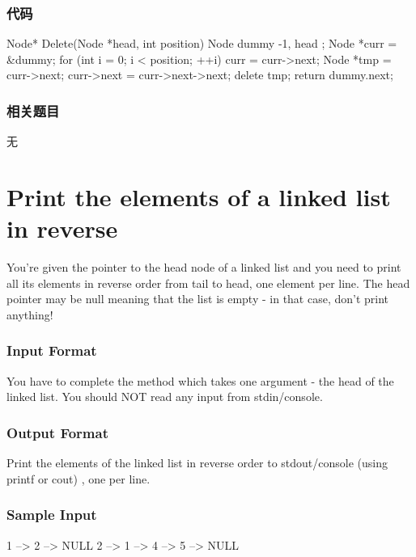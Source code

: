 \subsubsection{代码}
\begin{Code}
Node* Delete(Node *head, int position) {
    Node dummy{ -1, head };
    Node *curr = &dummy;
    for (int i = 0; i < position; ++i)
        curr = curr->next;
    Node *tmp = curr->next;
    curr->next = curr->next->next;
    delete tmp;
    return dummy.next;
}
\end{Code}


\subsubsection{相关题目}
\begindot
\item 无
\myenddot


\section{Print the elements of a linked list in reverse} %
\label{sec:Print-the-elements-of-a-linked-list-in-reverse}

You’re given the pointer to the head node of a linked list and you need to print all its elements in reverse order from tail to head, one element per line. The head pointer may be null meaning that the list is empty - in that case, don’t print anything!


\subsubsection{Input Format}
You have to complete the  method which takes one argument - the head of the linked list. You should NOT read any input from stdin/console.


\subsubsection{Output Format}
Print the elements of the linked list in reverse order to stdout/console (using printf or cout) , one per line.


\subsubsection{Sample Input}
\begin{Code}
1 –> 2 –> NULL
2 –> 1 –> 4 –> 5 –> NULL
\end{Code}


